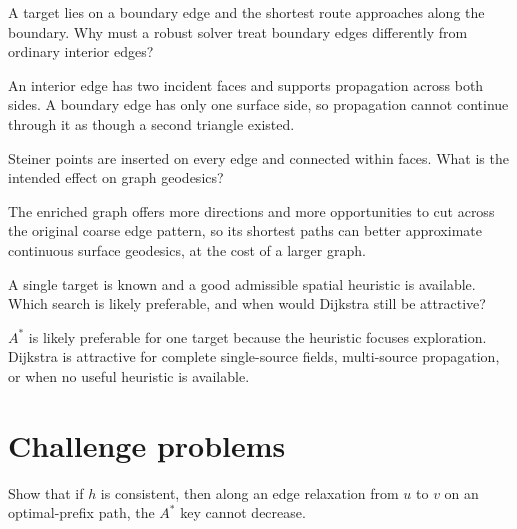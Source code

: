 \begin{problem}\label{prob:vii39-10}
A target lies on a boundary edge and the shortest route approaches along the boundary.  Why must a robust solver treat boundary edges differently from ordinary interior edges?
\end{problem}

\begin{solution}
An interior edge has two incident faces and supports propagation across both sides.  A boundary edge has only one surface side, so propagation cannot continue through it as though a second triangle existed.
\end{solution}

\begin{problem}\label{prob:vii39-11}
Steiner points are inserted on every edge and connected within faces.  What is the intended effect on graph geodesics?
\end{problem}

\begin{solution}
The enriched graph offers more directions and more opportunities to cut across the original coarse edge pattern, so its shortest paths can better approximate continuous surface geodesics, at the cost of a larger graph.
\end{solution}

\begin{problem}\label{prob:vii39-12}
A single target is known and a good admissible spatial heuristic is available.  Which search is likely preferable, and when would Dijkstra still be attractive?
\end{problem}

\begin{solution}
\(A^\ast\) is likely preferable for one target because the heuristic focuses exploration.  Dijkstra is attractive for complete single-source fields, multi-source propagation, or when no useful heuristic is available.
\end{solution}

\section{Challenge problems}

\begin{problem}\label{prob:vii39-ch01}
Show that if \(h\) is consistent, then along an edge relaxation from \(u\) to \(v\) on an optimal-prefix path, the \(A^\ast\) key cannot decrease.
\end{problem}

